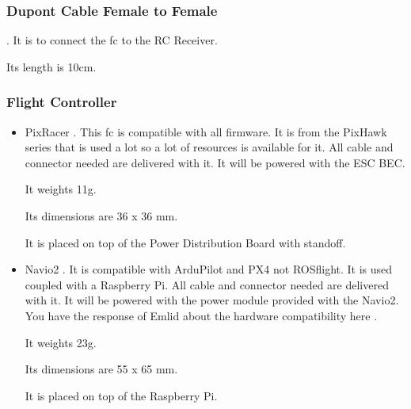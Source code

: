             \subsubsection{Dupont Cable Female to Female}
                \cite{bangood_dupont_cable}. It is to connect the \gls{fc} to the RC Receiver.
                
                Its length is 10cm.
                
            \subsubsection{Flight Controller}
                \begin{itemize}
                    \item PixRacer \cite{mrobotics_pixracer}. This \gls{fc} is compatible with all firmware. It is from the PixHawk series that is used a lot so a lot of resources is available for it. All cable and connector needed are delivered with it. It will be powered with the ESC BEC.
                    
                    It weights 11g.
                    
                    Its dimensions are 36 x 36 mm.
                    
                    It is placed on top of the Power Distribution Board with standoff.
                    
                    \item Navio2 \cite{emlid_navio2}. It is compatible with ArduPilot and PX4 not ROSflight. It is used coupled with a Raspberry Pi. All cable and connector needed are delivered with it. It will be powered with the power module \cite{emlid_power_module} provided with the Navio2. You have the response of Emlid about the hardware compatibility here \cite{emlid_rpi_compatibility}.
                    
                    It weights 23g.
                    
                    Its dimensions are 55 x 65 mm.
                    
                    It is placed on top of the Raspberry Pi.
                \end{itemize}
                
